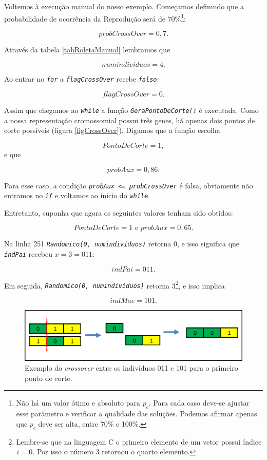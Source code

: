 	Voltemos à execução manual do nosso exemplo. Começamos definindo que a probabilidade de ocorrência da Reprodução será de 70\%\footnote{Não há um valor ótimo e absoluto para $p_c$. Para cada caso deve-se ajustar esse parâmetro e verificar a qualidade das soluções. Podemos afirmar apenas que $p_c$ deve ser alta, entre 70\% e 100\%.}:
	
	$$
		probCrossOver = 0,7.
	$$	
	
	Através da tabela \ref{tabRoletaManual} lembramos que 
	
	$$
		numindividuos = 4.
	$$
	
	Ao entrar no \textit{\texttt{for}} a \textit{\texttt{flagCrossOver}} recebe \textit{\texttt{falso}}:
	
	$$
		flagCrossOver = 0.
	$$

	Assim que chegamos ao \textit{\texttt{while}} a função \textit{\texttt{GeraPontoDeCorte()}} é executada. Como a nossa representação cromossomial possui três genes, há apenas dois pontos de corte possíveis (figura \ref{figCrossOver}). Digamos que a função escolha
	
	$$
		PontoDeCorte = 1,
	$$
	e que
	
	$$
		probAux = 0,86.
	$$
	
	Para esse caso, a condição \textit{\texttt{probAux <= probCrossOver}} é falsa, obviamente não entramos no \textit{\texttt{if}} e voltamos ao início do \textit{\texttt{while}}.
	
	Entretanto, suponha que agora os seguintes valores tenham sido obtidos:
	
	$$
		PontoDeCorte = 1 \mbox{  e  } probAux = 0,65.
	$$
	
	Na linha 251 \textit{\texttt{Randomico(0, numindividuos)}} retorna 0, e isso significa que \textit{\texttt{indPai}} recebeu $x = 3 = 011$:
	
	$$
		indPai = 011.
	$$
	
	Em seguida, \textit{\texttt{Randomico(0, numindividuos)}} retorna 3\footnote{Lembre-se que na linguagem C o primeiro elemento de um vetor possui índice \textit{i} = 0. Por isso o número 3 retornou o quarto elemento.}, e isso implica
	
	$$
		indMae = 101.
	$$
	
	\begin{figure}[htp]
		\begin{center}
			\includegraphics[width=13cm]{figs/ga/exemplo_crossover.png}
		\end{center}
		\caption{\label{figExemploCrossOver} Exemplo do \textit{crossover} entre os indivíduos 011 e 101 para o primeiro ponto de corte.}
	\end{figure}
	
